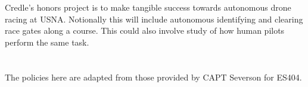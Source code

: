 \documentclass[10pt,courier]{navymemo}
\begin{document}
\section{} Credle's honors project is to make tangible success towards autonomous drone racing at USNA. Notionally this will include autonomous identifying and clearing race gates along a course. This could also involve study of how human pilots perform the same task.   

\section{}  The policies here are adapted from those provided by CAPT Severson for ES404.  
\end{document}
